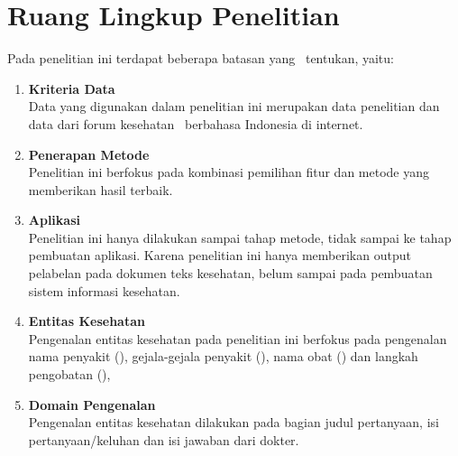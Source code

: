 \section{Ruang Lingkup Penelitian}
Pada penelitian ini terdapat beberapa batasan yang \saya~tentukan, yaitu:
\begin{enumerate}
\item{\bf Kriteria Data}\\
Data yang digunakan dalam penelitian ini merupakan data penelitian \cite{skripsiKakRadit} dan data dari forum kesehatan \ol~berbahasa Indonesia di internet.
	
\item{\bf Penerapan Metode}\\
Penelitian ini berfokus pada kombinasi pemilihan fitur dan metode yang memberikan hasil terbaik.
	
\item{\bf Aplikasi}\\
Penelitian ini hanya dilakukan sampai tahap metode, tidak sampai ke tahap pembuatan aplikasi. Karena penelitian ini hanya memberikan output pelabelan pada dokumen teks kesehatan, belum sampai pada pembuatan sistem informasi kesehatan.

\item{\bf Entitas Kesehatan}\\
Pengenalan entitas kesehatan pada penelitian ini berfokus pada pengenalan nama penyakit (\disease), gejala-gejala penyakit (\symptom), nama obat (\drug) dan langkah pengobatan (\treatment),

\item{\bf Domain Pengenalan}\\
Pengenalan entitas kesehatan dilakukan pada bagian judul pertanyaan, isi pertanyaan/keluhan dan isi jawaban dari dokter.
\end{enumerate}


